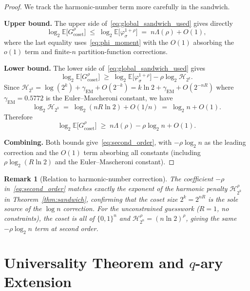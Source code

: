 \documentclass[journal,10pt,onecolumn]{IEEEtran}
\newtheorem{remark}{Remark}
\newcommand{\Eb}{\mathbb{E}}
\newcommand{\Harm}{\mathcal{H}}
\begin{document}
\begin{proof}
We track the harmonic-number term more carefully in the sandwich.

\medskip
\noindent\textbf{Upper bound.}
The upper side of~\eqref{eq:global_sandwich_used} gives directly
\[
    \log_2\Eb\bigl[G_{\mathrm{coset}}^\rho\bigr]
    \;\le\;
    \log_2\Eb\bigl[\varphi_\sigma^{1+\rho}\bigr]
    \;=\;
    n\Lambda(\rho)+O(1),
\]
where the last equality uses~\eqref{eq:phi_moment} with the $O(1)$
absorbing the $o(1)$ term and finite-$n$ partition-function corrections.

\medskip
\noindent\textbf{Lower bound.}
The lower side of~\eqref{eq:global_sandwich_used} gives
\[
    \log_2\Eb\bigl[G_{\mathrm{coset}}^\rho\bigr]
    \;\ge\;
    \log_2\Eb\bigl[\varphi_\sigma^{1+\rho}\bigr]
    -\rho\log_2\Harm_{2^k}.
\]
Since $\Harm_{2^k}=\log(2^k)+\gamma_{\mathrm{EM}}+O(2^{-k})
=k\ln 2+\gamma_{\mathrm{EM}}+O(2^{-nR})$ where
$\gamma_{\mathrm{EM}} =  0.5772$ is the Euler--Mascheroni
constant, we have
\[
    \log_2\Harm_{2^k}
    \;=\;
    \log_2(nR\ln 2)+O(1/n)
    \;=\;
    \log_2 n + O(1).
\]
Therefore
\[
    \log_2\Eb\bigl[G_{\mathrm{coset}}^\rho\bigr]
    \;\ge\;
    n\Lambda(\rho)
    -\rho\log_2 n
    +O(1).
\]

\noindent\textbf{Combining.}
Both bounds give~\eqref{eq:second_order}, with $-\rho\log_2 n$
as the leading correction and the $O(1)$ term absorbing all
constants (including $\rho\log_2(R\ln 2)$ and the
Euler--Mascheroni constant).
\end{proof}

\begin{remark}[Relation to harmonic-number correction]
The coefficient $-\rho$ in~\eqref{eq:second_order} matches exactly
the exponent of the harmonic penalty $\Harm_{2^k}^\rho$ in
Theorem~\ref{thm:sandwich}, confirming that the coset size $2^k=2^{nR}$
is the sole source of the $\log n$ correction.  For the unconstrained
guesswork ($R=1$, no constraints), the coset is all of $\{0,1\}^n$
and $\Harm_{2^n}^\rho =  (n\ln 2)^\rho$, giving the same
$-\rho\log_2 n$ term at second order.
\end{remark}




\section{Universality Theorem and $q$-ary Extension}
\label{sec:universality}
\end{document}
